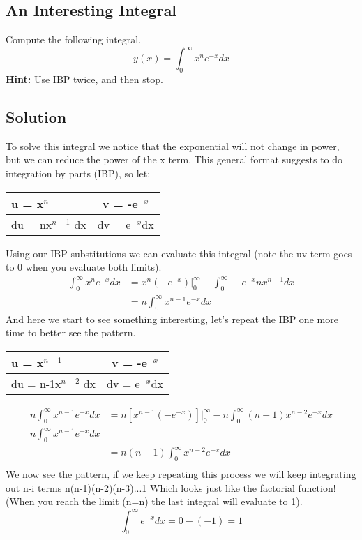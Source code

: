\documentclass{article}
\newcommand{\be}{\begin{equation}}
\newcommand{\ee}{\end{equation}}
\begin{document}
\subsection{An Interesting Integral}
Compute the following integral.  
\be
y(x) = \int_0^\infty x^{n}e^{-x}dx 
\ee
\textbf{Hint:} Use IBP twice, and then stop. 

\subsection*{Solution}
To solve this integral we notice that the exponential will not change in power, but we can reduce the power of the x term. 
This general format suggests to do integration by parts (IBP), so let: 
\begin{center}
  \begin{tabular}{ | l | c | }
    \hline
    u = x$^n$ & v = -e$^{-x}$ \\ \hline
    du = nx$^{n-1}$ dx & dv = e$^{-x}$dx  \\
    \hline
  \end{tabular}
\end{center}
Using our IBP substitutions we can evaluate this integral (note the uv term goes to 0 when you evaluate both limits).
\begin{equation}
\begin{split}
    \int_0^\infty x^{n}e^{-x}dx &= x^n(-e^{-x}) \Big|_0^\infty - \int_0^\infty -e^{-x}nx^{n-1}dx \\
    &= n\int_0^\infty x^{n-1}e^{-x}dx
    \end{split}
\end{equation}
And here we start to see something interesting, let's repeat the IBP one more time to better see the pattern.
\begin{center}
  \begin{tabular}{ | l | c | }
    \hline
    u = x$^{n-1}$ & v = -e$^{-x}$ \\ \hline
    du = n-1x$^{n-2}$ dx & dv = e$^{-x}$dx  \\
    \hline
  \end{tabular}
\end{center}
\begin{equation}
\begin{split}
n\int_0^\infty x^{n-1}e^{-x}dx &= n\left[ x^{n-1}(-e^{-x})\right]\Big|_0^\infty - n\int_0^\infty (n-1)x^{n-2}e^{-x}dx \\
n\int_0^\infty x^{n-1}e^{-x}dx & \\ &=n(n-1)\int_0^\infty x^{n-2}e^{-x}dx \\
\end{split}
\end{equation}
We now see the pattern, if we keep repeating this process we will keep integrating out n-i terms n(n-1)(n-2)(n-3)...1
Which looks just like the factorial function!
(When you reach the limit (n=n) the last integral will evaluate to 1). 
\be
\int_0^\infty e^{-x}dx = 0 - (-1) = 1
\ee
\end{document}
